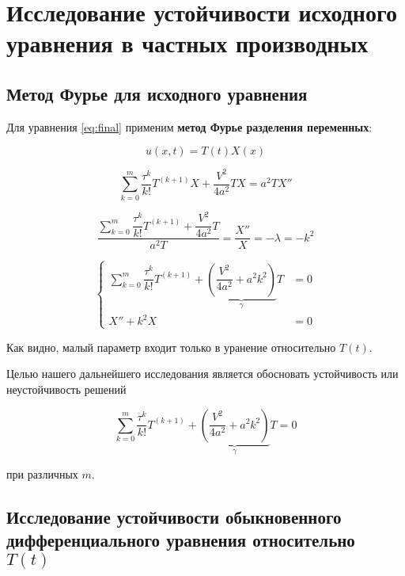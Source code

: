 \section{Исследование устойчивости исходного уравнения в частных производных}

\subsection{Метод Фурье для исходного уравнения}

Для уравнения \ref{eq:final} применим \textbf{метод Фурье разделения переменных}:

\begin{equation*}
u(x,t) = T(t) X(x)
\end{equation*}

\begin{equation*}
\sum\limits_{k=0}^{m} \dfrac{\tau^k}{k!} T^{(k+1)} X + \dfrac{V^2}{4a^2} T X =a^2 T X''
\end{equation*}

\begin{equation*}
\dfrac{\sum\limits_{k=0}^{m} \dfrac{\tau^k}{k!} T^{(k+1)} + \dfrac{V^2}{4a^2} T}{a^2 T} = \dfrac{X''}{X} = -\lambda = -k^2
\end{equation*}

\begin{equation}
\left\{
\begin{aligned}
\sum\limits_{k=0}^{m} \dfrac{\tau^k}{k!} T^{(k+1)} + \underbrace{ \left( \dfrac{V^2}{4a^2} + a^2 k^2 \right)}_{\gamma} T & = 0\\
X'' + k^2 X & = 0
\end{aligned}
\right.
\end{equation}

Как видно, малый параметр входит только в уранение относительно $T(t)$.

Целью нашего дальнейшего исследования является обосновать устойчивость или неустойчивость решений 

\begin{equation}
\sum\limits_{k=0}^{m} \dfrac{\tau^k}{k!} T^{(k+1)} + \underbrace{ \left( \dfrac{V^2}{4a^2} + a^2 k^2 \right)}_{\gamma} T = 0
\end{equation}

при различных $m$.

\subsection{Исследование устойчивости обыкновенного дифференциального уравнения относительно $T(t)$}